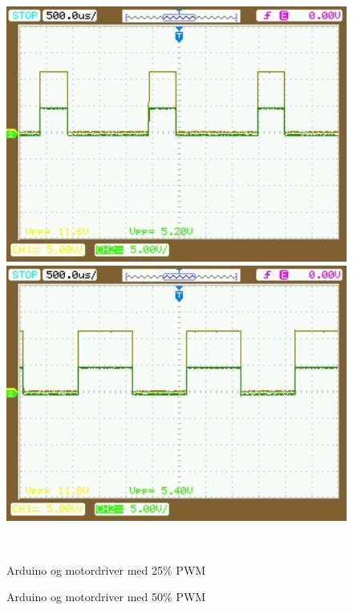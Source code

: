 \newpage

 \begin{figure}[htbp] \centering
\begin{minipage}[b]{0.48\textwidth} \centering
\includegraphics[width=1.00\textwidth]{billeder/Hardware/motor25PWM.jpg} %
\end{minipage} \hfill
\begin{minipage}[b]{0.48\textwidth} \centering
\includegraphics[width=1.00\textwidth]{billeder/Hardware/motor50PWM.jpg} %
\end{minipage} \\ %
\begin{minipage}[t]{0.48\textwidth}
\caption{Arduino og motordriver med 25$\%$ PWM} %
\label{fig:25PWM}
\end{minipage} \hfill
\begin{minipage}[t]{0.48\textwidth}
\caption{Arduino og motordriver med 50$\%$ PWM} %
\label{fig:50PWM}
\end{minipage}
\end{figure}

